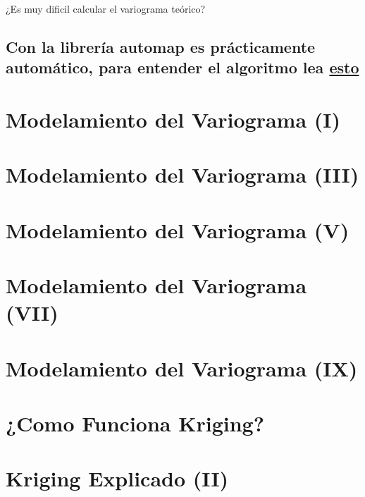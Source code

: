 \documentclass[]{article}
\begin{document}
 ¿Es muy dificil calcular el variograma teórico?

\subsection{\texorpdfstring{Con la librería \textbf{automap} es
prácticamente automático, para entender el algoritmo lea
\href{http://sci-hub.tw/https://www.sciencedirect.com/science/article/pii/S0098300409000867}{esto}}{Con la librería automap es prácticamente automático, para entender el algoritmo lea esto}}\label{con-la-libreria-automap-es-practicamente-automatico-para-entender-el-algoritmo-lea-esto}

\section{Modelamiento del Variograma
(I)}\label{modelamiento-del-variograma-i}

\section{Modelamiento del Variograma
(III)}\label{modelamiento-del-variograma-iii}

\section{Modelamiento del Variograma
(V)}\label{modelamiento-del-variograma-v}

\section{Modelamiento del Variograma
(VII)}\label{modelamiento-del-variograma-vii}

\section{Modelamiento del Variograma
(IX)}\label{modelamiento-del-variograma-ix}

\section{¿Como Funciona Kriging?}\label{como-funciona-kriging}

\section{Kriging Explicado (II)}\label{kriging-explicado-ii}
\end{document}
